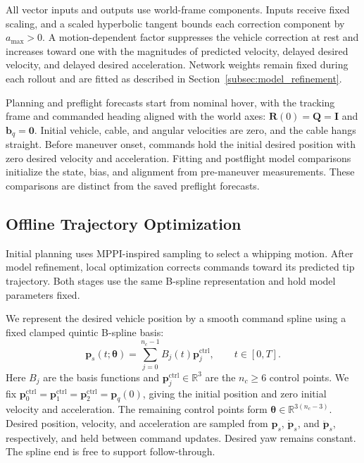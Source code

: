 All vector inputs and outputs use world-frame components.
Inputs receive fixed scaling, and a scaled hyperbolic tangent
bounds each correction component by $a_{\max}>0$.
A motion-dependent factor suppresses the vehicle correction at
rest and increases toward one with the magnitudes of predicted
velocity, delayed desired velocity, and delayed desired acceleration.
Network weights remain fixed during each rollout and are fitted
as described in Section~\ref{subsec:model_refinement}.

Planning and preflight forecasts start from nominal hover,
with the tracking frame and commanded heading aligned with the
world axes: $\mathbf R(0)=\mathbf Q=\mathbf I$ and
$\mathbf b_q=\mathbf0$. Initial vehicle, cable, and angular
velocities are zero, and the cable hangs straight.
Before maneuver onset, commands hold the initial desired
position with zero desired velocity and acceleration.
Fitting and postflight model comparisons initialize the state,
bias, and alignment from pre-maneuver measurements. These
comparisons are distinct from the saved preflight forecasts.

\subsection{Offline Trajectory Optimization}
\label{subsec:offline_planning}

Initial planning uses MPPI-inspired sampling to select a whipping
motion. After model refinement, local optimization corrects commands
toward its predicted tip trajectory. Both stages use the same
B-spline representation and hold model parameters fixed.

We represent the desired vehicle position by a smooth command spline
using a fixed clamped quintic B-spline basis:
\begin{equation}
\mathbf p_s(t;\boldsymbol\theta)
=\sum_{j=0}^{n_c-1}B_j(t)\mathbf p_j^{\mathrm{ctrl}},
\qquad t\in[0,T].
\label{eq:spline_reference}
\end{equation}
Here $B_j$ are the basis functions and $\mathbf p_j^{\mathrm{ctrl}}\in\mathbb R^3$
are the $n_c\geq6$ control points. We fix
$\mathbf p_0^{\mathrm{ctrl}}=\mathbf p_1^{\mathrm{ctrl}}=\mathbf p_2^{\mathrm{ctrl}}=\mathbf p_q(0)$, giving the
initial position and zero initial velocity and acceleration.
The remaining control points form
$\boldsymbol\theta\in\mathbb R^{3(n_c-3)}$.
Desired position, velocity, and acceleration are sampled from
$\mathbf p_s$, $\dot{\mathbf p}_s$, and $\ddot{\mathbf p}_s$,
respectively, and held between command updates. Desired yaw
remains constant. The spline end is free to support follow-through.

